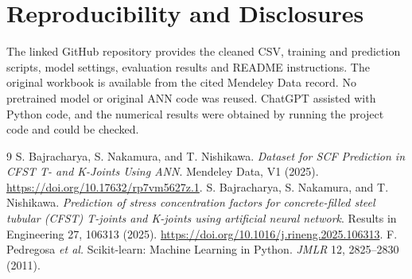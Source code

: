 \documentclass[10pt,a4paper]{article}
\begin{document}
\section*{Reproducibility and Disclosures}
The linked GitHub repository provides the cleaned CSV, training and prediction scripts, model settings, evaluation results and README instructions. The original workbook is available from the cited Mendeley Data record. No pretrained model or original ANN code was reused. ChatGPT assisted with Python code, and the numerical results were obtained by running the project code and could be checked.

\begingroup\small\begin{thebibliography}{9}\setlength{\itemsep}{0pt}
 S. Bajracharya, S. Nakamura, and T. Nishikawa. \emph{Dataset for SCF Prediction in CFST T- and K-Joints Using ANN}. Mendeley Data, V1 (2025). \url{https://doi.org/10.17632/rp7vm5627z.1}.
 S. Bajracharya, S. Nakamura, and T. Nishikawa. \emph{Prediction of stress concentration factors for concrete-filled steel tubular (CFST) T-joints and K-joints using artificial neural network}. Results in Engineering 27, 106313 (2025). \url{https://doi.org/10.1016/j.rineng.2025.106313}.
 F. Pedregosa \emph{et al.} Scikit-learn: Machine Learning in Python. \emph{JMLR} 12, 2825--2830 (2011).
\end{thebibliography}\endgroup
\end{document}
